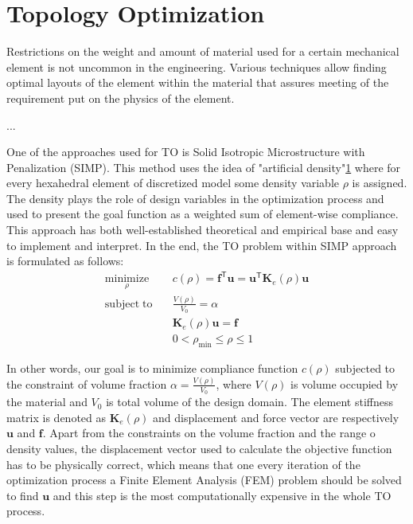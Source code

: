 \section{Topology Optimization}

Restrictions on the weight and amount of material used for a certain mechanical element is not uncommon in the engineering.
Various techniques allow finding optimal layouts of the element within the material that assures meeting of the requirement put on the physics of the element. 

...

\medskip
One of the approaches used for TO is Solid Isotropic Microstructure with Penalization (SIMP).
This method uses the idea of "artificial density"\ref{} where for every hexahedral element of discretized model some density variable $\rho$ is assigned.
The density plays the role of design variables in the optimization process and used to present the goal function as a weighted sum of element-wise compliance.
This approach has both well-established theoretical and empirical base and easy to implement and interpret.
In the end, the TO problem within SIMP approach is formulated as follows:
	\begin{align*}
		\underset{\rho}{\mathrm{minimize}} \quad & c(\rho) = \mathbf{f}^{\mathsf{T}} \mathbf{u} = \mathbf{u}^{\mathsf{T}} \mathbf{K}_{e}(\rho) \mathbf{u} \\
		\mathrm{subject \; to} \quad & \frac{V(\rho)}{V_{0}} = \alpha \\
		& \mathbf{K}_{e}(\rho) \mathbf{u} = \mathbf{f} \\
		& 0 < \rho_{\min} \leq \rho \leq 1
	\end{align*} 

In other words, our goal is to minimize compliance function $c(\rho)$ subjected to the constraint of volume fraction $\alpha = \frac{V(\rho)}{V_{0}}$, where $V(\rho)$ is volume occupied by the material and $ V_{0} $ is total volume of the design domain.
The element stiffness matrix is denoted as $\mathbf{K}_{e}(\rho)$ and displacement and force vector are respectively $\mathbf{u}$ and $\mathbf{f}$.
Apart from the constraints on the volume fraction and the range o density values, the displacement vector used to calculate the objective function has to be physically correct, which means that one every iteration of the optimization process a Finite Element Analysis (FEM) problem should be solved to find $\mathbf{u}$ and this step is the most computationally expensive in the whole TO process.
\medskip

